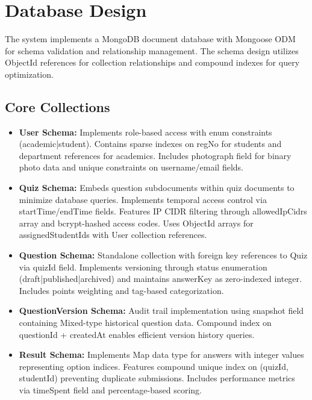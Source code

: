 \section{Database Design}

The system implements a MongoDB document database with Mongoose ODM for schema validation and relationship management. The schema design utilizes ObjectId references for collection relationships and compound indexes for query optimization.

\subsection{Core Collections}

\begin{itemize}
    \item \textbf{User Schema:} Implements role-based access with enum constraints (academic|student). Contains sparse indexes on regNo for students and department references for academics. Includes photograph field for binary photo data and unique constraints on username/email fields.
    
    \item \textbf{Quiz Schema:} Embeds question subdocuments within quiz documents to minimize database queries. Implements temporal access control via startTime/endTime fields. Features IP CIDR filtering through allowedIpCidrs array and bcrypt-hashed access codes. Uses ObjectId arrays for assignedStudentIds with User collection references.
    
    \item \textbf{Question Schema:} Standalone collection with foreign key references to Quiz via quizId field. Implements versioning through status enumeration (draft|published|archived) and maintains answerKey as zero-indexed integer. Includes points weighting and tag-based categorization.
    
    \item \textbf{QuestionVersion Schema:} Audit trail implementation using snapshot field containing Mixed-type historical question data. Compound index on questionId + createdAt enables efficient version history queries.
    
    \item \textbf{Result Schema:} Implements Map data type for answers with integer values representing option indices. Features compound unique index on (quizId, studentId) preventing duplicate submissions. Includes performance metrics via timeSpent field and percentage-based scoring.
\end{itemize}

